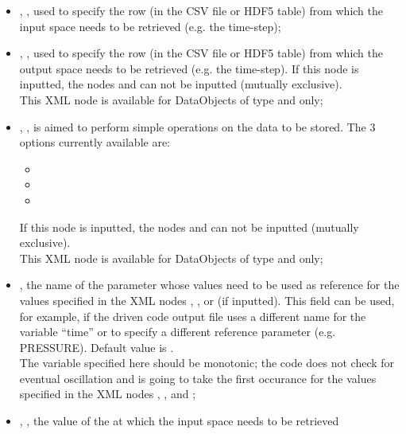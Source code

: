 \begin{itemize}
  \item {}, , used to
       specify  the row (in the CSV file or HDF5 table) from which the input space
      needs to be retrieved (e.g. the time-step);
  \item {}, , used to
       specify  the row (in the CSV file or HDF5 table) from which the output space
      needs to be retrieved (e.g. the time-step). If this node is inputted, the nodes
        and   can not be inputted (mutually exclusive).
     \\\nb This XML node is available for DataObjects of type  and  only;
  \item {}, , is aimed to perform
       simple operations on the data to be stored.
       The 3 options currently available are:
       \begin{itemize}
          \item {}
          \item {}
          \item {}
       \end{itemize}
       If this node is inputted, the nodes
        and   can not be inputted (mutually exclusive).
       \\\nb This XML node is available for DataObjects of type  and  only;
  \item {},  the name of
    the parameter whose values need to be used as reference for the values
    specified in the XML nodes ,
    , or  (if inputted).
    This field can be used, for example, if the driven code output file uses  a
    different name for the variable ``time'' or to specify a different reference
    parameter (e.g. PRESSURE). Default value is .
    \\\nb The variable specified here should be monotonic; the code does not
    check for eventual oscillation and is going to take the first occurance for
    the values specified in the XML nodes ,
    , and  ;
  \item {}, , the value of the  at which the input space needs to be retrieved

\end{itemize}
